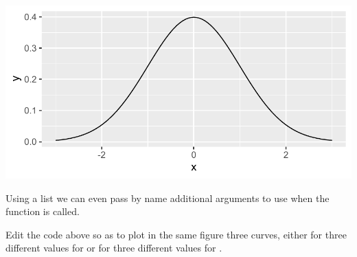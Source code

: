 \documentclass[krantz2]{krantz}\usepackage{knitr}
\begin{document}
\begin{knitrout}\footnotesize
{}\color{fgcolor}\begin{kframe}
\begin{alltt}
\hlstd{(}\hlstd{(} \hlstd{=} \hlopt{-}\hlopt{:}\hlstd{),} \hlstd{(}  \hlopt{+}
  \hlstd{(} 
\end{alltt}
\end{kframe}

{\centering \includegraphics[width=.7\textwidth]{figure/pos-function-plot-01-1} 

}


\end{knitrout}

Using a list we can even pass by name additional arguments to use when the function is called.

\begin{knitrout}\footnotesize
{}\color{fgcolor}\begin{kframe}
\begin{alltt}
\hlstd{(}\hlstd{(} \hlstd{=} \hlopt{-}\hlopt{:}\hlstd{),} \hlstd{(}  \hlopt{+}
  \hlstd{(}   \hlstd{=} \hlstd{(} \hlstd{=} \hlstd{,}  \hlstd{=} \hlstd{))}
\end{alltt}
\end{kframe}
\end{knitrout}

\begin{playground}
Edit the code above so as to plot in the same figure three curves, either for three different values for  or for three different values for .
\end{playground}
\end{document}
